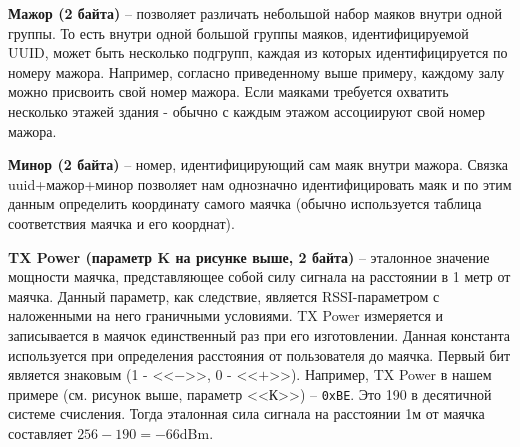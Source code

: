 \textbf{Мажор (2 байта)} – позволяет различать небольшой набор маяков внутри одной группы. То есть внутри одной большой группы маяков, идентифицируемой UUID, может быть несколько подгрупп, каждая из которых идентифицируется по номеру мажора. Например, согласно приведенному выше примеру, каждому залу можно присвоить свой номер мажора. Если маяками требуется охватить несколько этажей здания - обычно с каждым этажом ассоциируют свой номер мажора.

\textbf{Минор (2 байта)} – номер, идентифицирующий сам маяк внутри мажора. Связка uuid+мажор+минор позволяет нам однозначно идентифицировать маяк и по этим данным определить координату самого маячка (обычно используется таблица соответствия маячка и его коорднат).

\textbf{TX Power (параметр K на рисунке выше, 2 байта)} – эталонное значение мощности маячка, представляющее собой силу сигнала на расстоянии в 1 метр от маячка. Данный параметр, как следствие, является RSSI-параметром с наложенными на него граничными условиями. TX Power измеряется и записывается в маячок единственный раз при его изготовлении. Данная константа используется при определения расстояния от пользователя до маячка. Первый бит является знаковым (1 - <<$-$>>, 0 - <<$+$>>). Например, TX Power в нашем примере (см. рисунок выше, параметр <<К>>) – \texttt{0xBE}. Это 190 в десятичной системе счисления. Тогда эталонная сила сигнала на расстоянии 1м от маячка составляет $256-190=-66$dBm.